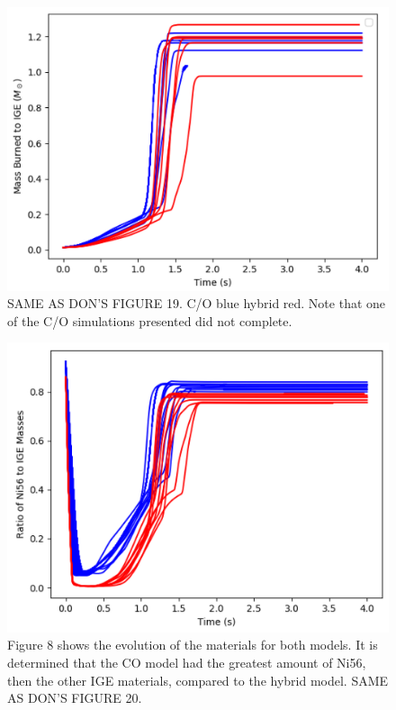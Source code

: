 \documentclass[iop,apj]{emulateapj}
\begin{document}
\begin{figure}
\includegraphics[width=\columnwidth]{figures/compare_burned_mass_v2.png}
\caption{\label{fig:compare}
SAME AS DON'S FIGURE 19.
C/O blue hybrid red.
Note that one of the C/O simulations presented did not complete.
}
\end{figure}

\begin{figure}
\includegraphics[width=\columnwidth]{figures/compare_ratio_v2.png}
\caption{\label{fig:compare_ratio}
Figure 8 shows the evolution of the materials for both models. It is determined that the CO model had the greatest amount of Ni56, then the other IGE materials, compared to the hybrid model.  
SAME AS DON'S FIGURE 20.
}
\end{figure}
\end{document}
